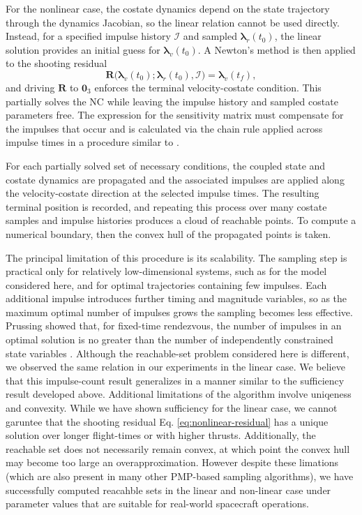 \documentclass[letterpaper, 10 pt, conference]{ieeeconf}  %
\begin{document}
For the nonlinear case, the costate dynamics depend on the state trajectory through the dynamics Jacobian, so the linear relation cannot be used directly. Instead, for a specified impulse history $\mathcal{I}$ and sampled $\boldsymbol{\lambda}_r(t_0)$, the linear solution provides an initial guess for $\boldsymbol{\lambda}_v(t_0)$. A Newton's method is then applied to the shooting residual
\begin{equation}
\boldsymbol{R}\bigl(\boldsymbol{\lambda}_v(t_0);\boldsymbol{\lambda}_r(t_0),\mathcal{I}\bigr)
=\boldsymbol{\lambda}_v(t_f),
\label{eq:nonlinear-residual}
\end{equation}
and driving $\boldsymbol{R}$ to $\mathbf{0}_3$ enforces the terminal velocity-costate condition. This partially solves the NC while leaving the impulse history and sampled costate parameters free. The expression for the sensitivity matrix must compensate for the impulses that occur and is calculated via the chain rule applied across impulse times in a procedure similar to \cite{Russell2007}. 

For each partially solved set of necessary conditions, the coupled state and costate dynamics are propagated and the associated impulses are applied along the velocity-costate direction at the selected impulse times. 
The resulting terminal position is recorded, and repeating this process over many costate samples and impulse histories produces a cloud of reachable points.
To compute a numerical boundary, then the convex hull of the propagated points is taken. 

The principal limitation of this procedure is its scalability. The sampling step is practical only for relatively low-dimensional systems, such as for the model considered here, and for optimal trajectories containing few impulses. Each additional impulse introduces further timing and magnitude variables, so as the maximum optimal number of impulses grows the sampling becomes less effective. Prussing showed that, for fixed-time rendezvous, the number of impulses in an optimal solution is no greater than the number of independently constrained state variables \cite{Prussing1995}. Although the reachable-set problem considered here is different, we observed the same relation in our experiments in the linear case. 
We believe that this impulse-count result generalizes in a manner similar to the sufficiency result developed above.
Additional limitations of the algorithm involve uniqeness and convexity. While we have shown sufficiency for the linear case, we cannot garuntee that the shooting residual Eq. \eqref{eq:nonlinear-residual} has a unique solution over longer flight-times or with higher thrusts. 
Additionally, the reachable set does not necessarily remain convex, at which point the convex hull may become too large an overapproximation. 
However despite these limations  (which are also present in many other PMP-based sampling algorithms), we have successfully computed reacahble sets in the linear and non-linear case under parameter values that are suitable for real-world spacecraft operations. 
\end{document}
